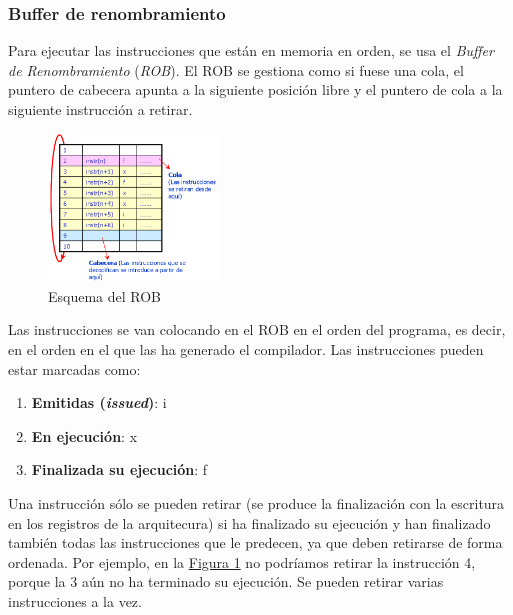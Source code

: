 \documentclass[10pt,a4paper,spanish]{report}
\begin{document}
\textcolor{azul}{\subsubsection{Buffer de renombramiento}}
Para ejecutar las instrucciones que están en memoria en orden, se usa el \textit{\textcolor{azul}{Buffer de Renombramiento}} (\textit{\textcolor{azul}{ROB}}). El ROB se gestiona como si fuese una cola, el puntero de cabecera apunta a la siguiente posición libre y el puntero de cola a la siguiente instrucción a retirar. 

\begin{figure}[!h]
\centering
\includegraphics[width=0.4\textwidth]{100}
\caption{Esquema del ROB}
\label{rob}
\end{figure}

Las instrucciones se van colocando en el ROB en el orden del programa, es decir, en el orden en el que las ha generado el compilador. Las instrucciones pueden estar marcadas como:
\begin{enumerate}[\color{azul}{$\heartsuit$}]
    \item \textbf{\textcolor{azul}{Emitidas (\textit{issued})}}: i
    \item \textbf{\textcolor{azul}{En ejecución}}: x
    \item \textbf{\textcolor{azul}{Finalizada su ejecución}}: f
\end{enumerate}


Una instrucción sólo se pueden retirar (se produce la finalización con la escritura en los registros de la arquitecura) si ha finalizado su ejecución y han finalizado también todas las instrucciones que le predecen, ya que deben retirarse de forma ordenada. Por ejemplo, en la \hyperref[rob]{Figura \ref*{rob}} no podríamos retirar la instrucción 4, porque la 3 aún no ha terminado su ejecución. Se pueden retirar varias instrucciones a la vez.
\end{document}
